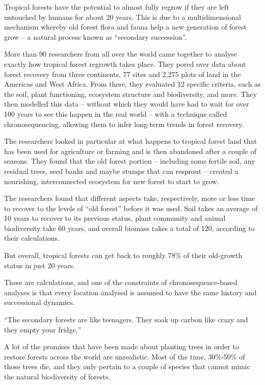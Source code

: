\documentclass[
]{book}
\begin{document}
Tropical forests have the potential to almost fully regrow if they are left untouched by humans for about 20 years. This is due to a multidimensional mechanism whereby old forest flora and fauna help a new generation of forest grow -- a natural process known as ``secondary succession''.

More than 90 researchers from all over the world came together to analyse exactly how tropical forest regrowth takes place. They pored over data about forest recovery from three continents, 77 sites and 2,275 plots of land in the Americas and West Africa. From there, they evaluated 12 specific criteria, such as the soil, plant functioning, ecosystem structure and biodiversity, and more. They then modelled this data -- without which they would have had to wait for over 100 years to see this happen in the real world -- with a technique called chronosequencing, allowing them to infer long-term trends in forest recovery.

The researchers looked in particular at what happens to tropical forest land that has been used for agriculture or farming and is then abandoned after a couple of seasons. They found that the old forest portion -- including some fertile soil, any residual trees, seed banks and maybe stumps that can resprout -- created a nourishing, interconnected ecosystem for new forest to start to grow.

The researchers found that different aspects take, respectively, more or less time to recover to the levels of ``old forest'' before it was used. Soil takes an average of 10 years to recover to its previous status, plant community and animal biodiversity take 60 years, and overall biomass takes a total of 120, according to their calculations.

But overall, tropical forests can get back to roughly 78\% of their old-growth status in just 20 years.

These are calculations, and one of the constraints of chronosequence-based analyses is that every location analysed is assumed to have the same history and successional dynamics.

``The secondary forests are like teenagers. They soak up carbon like crazy and they empty your fridge,''

A lot of the promises that have been made about planting trees in order to restore forests across the world are unrealistic. Most of the time, 30\%-50\% of those trees die, and they only pertain to a couple of species that cannot mimic the natural biodiversity of forests.
\end{document}
